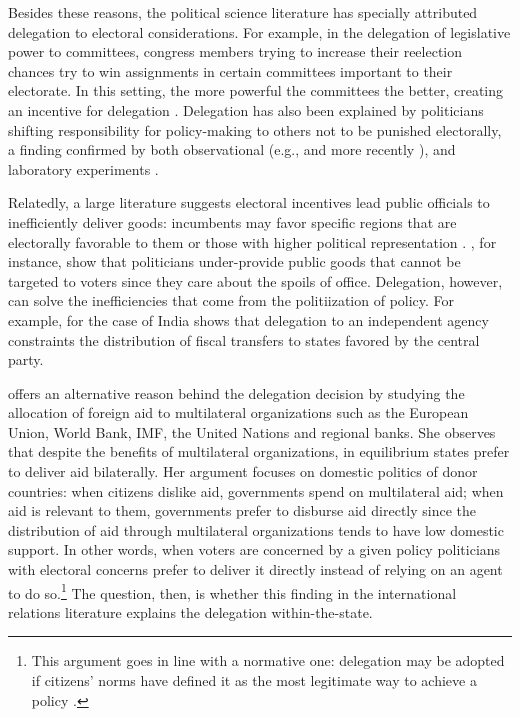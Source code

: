 \documentclass[12pt]{amsart}
\numberwithin{equation}{section}
\theoremstyle{definition}
\theoremstyle{definition}
\theoremstyle{definition}
\begin{document}

 Besides these reasons, the political science literature has specially attributed delegation to electoral considerations. For example, in the delegation of legislative power to committees, congress members trying to increase their reelection chances try to win assignments in certain committees important to their electorate. In this setting, the more powerful the committees the better, creating an incentive for delegation \citep{mccubbins_1991}. Delegation has also been explained by politicians shifting responsibility for policy-making to others not to be punished electorally, a finding confirmed by both observational (e.g., \citet{fiorina_1982} and more recently \citep{loftis_2014}),  and laboratory experiments \citep{bartling_fischbacher_2012}. 
 
 Relatedly, a large literature suggests electoral incentives lead public officials to inefficiently deliver goods: incumbents may favor specific regions that are electorally favorable to them \citep{schady_2000, Miguel_zaidi_2003, cole_2004, dahlberg_2002} or those with higher political representation  \citep{wright_1974, porto_2001, ansolabehere_etal_2002}. \citet{lizzeri_2001}, for instance, show that politicians under-provide public goods that cannot be targeted to voters since they care about the spoils of office. Delegation, however, can solve the inefficiencies that come from the politiization of policy. For example, for the case of India \citet{khemani_2007} shows that delegation to an independent agency constraints the distribution of fiscal transfers to states favored by the central party.  
 
 \citet{milner_2004} offers an alternative reason behind the delegation decision by studying the allocation of foreign aid to multilateral organizations such as the European Union, World Bank, IMF, the United Nations and regional banks. She observes that despite the benefits of multilateral organizations, in equilibrium states prefer to deliver aid bilaterally. Her argument focuses on domestic politics of donor countries: when citizens dislike aid, governments spend on multilateral aid; when aid is relevant to them, governments prefer to disburse aid directly since the distribution of aid through multilateral organizations tends to have low domestic support. In other words, when voters are concerned by a given policy politicians with electoral concerns prefer to deliver it directly instead of relying on an agent to do so.\footnote{This argument goes in line with a normative one: delegation may be adopted if citizens’ norms have defined it as the most legitimate way to achieve a policy \citep{finnemore_1996, ruggie_1993, milner_2011}.} The question, then, is whether this finding in the international relations literature explains the delegation within-the-state. 
 
\end{document}
